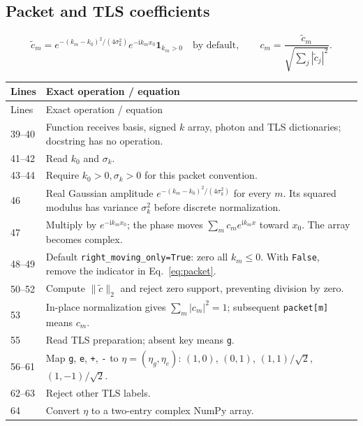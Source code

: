 \documentclass[11pt,a4paper]{article}
\newcommand{\code}[1]{\nolinkurl{#1}}
\newcommand{\ii}{\mathrm i}
\begin{document}
\subsection{Packet and TLS coefficients}

\begin{equation}
\widetilde c_m=
e^{-(k_m-k_0)^2/(4\sigma_k^2)}
e^{-\ii k_m x_0}\mathbf1_{k_m>0}
\quad\text{by default},\qquad
c_m=\frac{\widetilde c_m}{\sqrt{\sum_j|\widetilde c_j|^2}}.
\label{eq:packet}
\end{equation}
\begin{longtable}{p{}p{}}
\toprule Lines & Exact operation / equation\\\midrule\endfirsthead
\toprule Lines & Exact operation / equation\\\midrule\endhead
39--40 & Function receives basis, signed $k$ array, photon and TLS dictionaries; docstring has no operation.\\
41--42 & Read $k_0$ and $\sigma_k$.\\
43--44 & Require $k_0>0,\sigma_k>0$ for this packet convention.\\
46 & Real Gaussian amplitude $e^{-(k_m-k_0)^2/(4\sigma_k^2)}$ for every $m$. Its squared modulus has variance $\sigma_k^2$ before discrete normalization.\\
47 & Multiply by $e^{-\ii k_mx_0}$; the phase moves $\sum_m c_me^{\ii k_mx}$ toward $x_0$. The array becomes complex.\\
48--49 & Default \code{right_moving_only=True}: zero all $k_m\leq0$. With \code{False}, remove the indicator in Eq.~\eqref{eq:packet}.\\
50--52 & Compute $\|\widetilde c\|_2$ and reject zero support, preventing division by zero.\\
53 & In-place normalization gives $\sum_m|c_m|^2=1$; subsequent \code{packet[m]} means $c_m$.\\
55 & Read TLS preparation; absent key means \code{g}.\\
56--61 & Map \code{g}, \code{e}, \code{+}, \code{-} to $\eta=(\eta_g,\eta_e)$: $(1,0)$, $(0,1)$, $(1,1)/\sqrt2$, $(1,-1)/\sqrt2$.\\
62--63 & Reject other TLS labels.\\
64 & Convert $\eta$ to a two-entry complex NumPy array.\\
\bottomrule
\end{longtable}
\end{document}

